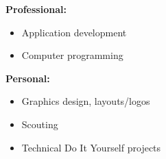\documentclass[]{friggeri-cv}
\providecommand{\tightlist}{%
\setlength{\itemsep}{0pt}\setlength{\parskip}{0pt}}
\begin{document}
\textbf{Professional:}
\begin{multicols}{2}
\begin{itemize}
  \tightlist{}
  \item Application development
  \item Computer programming
\end{itemize}
\end{multicols}


\textbf{Personal:}
\begin{multicols}{2}
\begin{itemize}
  \tightlist{}
  \item Graphics design, layouts/logos
  \item Scouting
  \item Technical Do It Yourself projects
\end{itemize}
\end{multicols}

\end{document}
